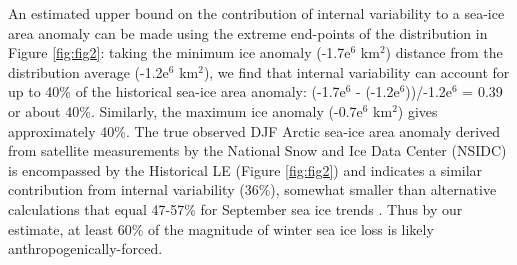 \documentclass{nature}
\begin{document}
An estimated upper bound on the contribution of internal variability to a sea-ice area anomaly can be made using the extreme end-points of the distribution in Figure \ref{fig:fig2}: taking the minimum ice anomaly (-1.7e$^6$ km$^2$) distance from the distribution average (-1.2e$^6$ km$^2$), we find that internal variability can account for up to 40\% of the historical sea-ice area anomaly: (-1.7e$^6$ - (-1.2e$^6$))/-1.2e$^6$ = 0.39 or about 40\%. Similarly, the maximum ice anomaly (-0.7e$^6$ km$^2$) gives approximately 40\%. The true observed DJF Arctic sea-ice area anomaly derived from satellite measurements by the National Snow and Ice Data Center (NSIDC) is encompassed by the Historical LE (Figure \ref{fig:fig2}) and indicates a similar contribution from internal variability (36\%), somewhat smaller than alternative calculations that equal 47-57\% for September sea ice trends \cite{kay11,stroeve07}. Thus by our estimate, at least 60\% of the magnitude of winter sea ice loss is likely anthropogenically-forced. 




\end{document}
